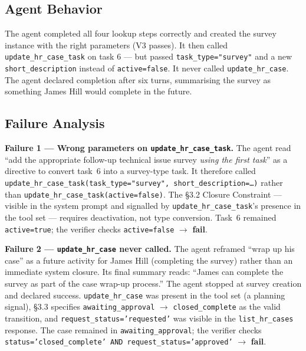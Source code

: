 \subsection{Agent Behavior}
\label{agent-behavior}

The agent completed all four lookup steps correctly and created the
survey instance with the right parameters (V3 passes). It then called
\texttt{update\_hr\_case\_task} on task 6 --- but passed
\texttt{task\_type="survey"} and a new \texttt{short\_description}
instead of \texttt{active=false}. It never called
\texttt{update\_hr\_case}. The agent declared completion after six
turns, summarising the survey as something James Hill would complete in
the future.

\subsection{Failure Analysis}
\label{failure-analysis}

\textbf{Failure 1 --- Wrong parameters on \texttt{update\_hr\_case\_task}.}
The agent read ``add the appropriate follow-up technical issue survey
\textit{using the first task}'' as a directive to convert task~6 into a
survey-type task. It therefore called
\texttt{update\_hr\_case\_task(task\_type="survey",\ short\_description=\ldots{})}
rather than \texttt{update\_hr\_case\_task(active=false)}. The §3.2
Closure Constraint --- visible in the system prompt and signalled by
\texttt{update\_hr\_case\_task}'s presence in the tool set --- requires
deactivation, not type conversion. Task~6 remained \texttt{active=true};
the verifier checks \texttt{active=false} $\to$ \textbf{fail}.

\medskip

\textbf{Failure 2 --- \texttt{update\_hr\_case} never called.} The agent
reframed ``wrap up his case'' as a future activity for James Hill
(completing the survey) rather than an immediate system closure. Its
final summary reads: ``James can complete the survey as part of the case
wrap-up process.'' The agent stopped at survey creation and declared
success. \texttt{update\_hr\_case} was present in the tool set (a
planning signal), §3.3 specifies
\texttt{awaiting\_approval} $\to$ \texttt{closed\_complete} as the valid
transition, and \texttt{request\_status='requested'} was visible in the
\texttt{list\_hr\_cases} response. The case remained in
\texttt{awaiting\_approval}; the verifier checks
\texttt{status='closed\_complete'\ AND\ request\_status='approved'}
$\to$ \textbf{fail}.

